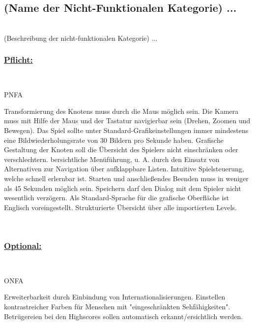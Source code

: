 %
%

\subsection{(Name der Nicht-Funktionalen Kategorie) ...}

%
%
\renewcommand{\K}{}

~\\
(Beschreibung der nicht-funktionalen Kategorie) ...
\\

%
%
\subsubsection*{\underline{Pflicht:}}~\\

\begin{ids}{\gls{PNFA\K}} 

 	\id[10] Transformierung des Knotens muss durch die Maus möglich sein.
 	\id[20] Die Kamera muss mit Hilfe der Maus und der Tastatur navigierbar sein (Drehen,
Zoomen und Bewegen).
 	\id[30] Das Spiel sollte unter Standard-Grafikeinstellungen immer mindestens eine Bildwiederholungsrate von 30 Bildern pro Sekunde haben.
 	\id[40] Grafische Gestaltung der Knoten soll die Übersicht des Spielers nicht einschränken oder verschlechtern.
 	bersichtliche Menüführung, u. A. durch den Einsatz von Alternativen zur Navigation über aufklappbare Listen.
  	\id[60] Intuitive Spielsteuerung, welche schnell erlernbar ist.
  	\id[70] Starten und anschließendes Beenden muss in weniger als 45 Sekunden möglich sein.
  	\id[80] Speichern darf den Dialog mit dem Spieler nicht wesentlich verzögern.
  	\id[90] Als Standard-Sprache für die grafische Oberfläche ist Englisch voreingestellt.
  	\id[100] Strukturierte Übersicht über alle importierten Levels.
  		

	
\end{ids}

~\\


%
%
\subsubsection*{\underline{Optional:}}~\\


\begin{ids}{\gls{ONFA\K}}

 	\id[110] Erweiterbarkeit durch Einbindung von Internationalisierungen.
 	\id[120] Einstellen kontrastreicher Farben für Menschen mit "eingeschränkten Sehfähigkeiten".
  	\id[130] Betrügereien bei den Highscores sollen automatisch erkannt/ersichtlich werden.
	
\end{ids}

~\\